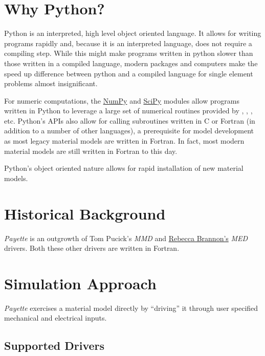 \documentclass[letterpaper,10pt,english]{sphinxmanual}
\begin{document}
\section{Why Python?}
\label{Files/introduction:why-python}
Python is an interpreted, high level object oriented language. It allows for
writing programs rapidly and, because it is an interpreted language, does not
require a compiling step. While this might make programs written in python slower
than those written in a compiled language, modern packages and computers make the
speed up difference between python and a compiled language for single element
problems almost insignificant.

For numeric computations, the \href{http://www.numpy.org}{NumPy} and \href{http://www.scipy.org}{SciPy} modules allow programs written in Python to leverage
a large set of numerical routines provided by , ,
, etc. Python's APIs also allow for calling subroutines written in
C or Fortran (in addition to a number of other languages), a prerequisite for
model development as most legacy material models are written in Fortran. In
fact, most modern material models are still written in Fortran to this day.

Python's object oriented nature allows for rapid installation of new material
models.


\section{Historical Background}
\label{Files/introduction:historical-background}
\emph{Payette} is an outgrowth of Tom Pucick's \emph{MMD} and \href{http://www.mech.utah.edu/~brannon/}{Rebecca Brannon's} \emph{MED} drivers. Both these other drivers
are written in Fortran.


\section{Simulation Approach}
\label{Files/introduction:simulation-approach}
\emph{Payette} exercises a material model directly by ``driving'' it through user
specified mechanical and electrical inputs.


\subsection{Supported Drivers}
\label{Files/introduction:supported-drivers}
\end{document}
